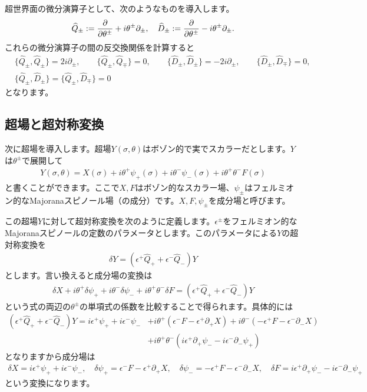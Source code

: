 \documentclass[report,paper=a4, fontsize=12pt, line_length=16cm, number_of_lines=34,dvipdfmx]{jlreq}
\numberwithin{equation}{chapter}
\numberwithin{equation}{section}
\newcommand{\del}{\partial}
\newcommand{\Qd}{\widehat{Q}}
\newcommand{\Dd}{\widehat{D}}
\begin{document}
超世界面の微分演算子として、次のようなものを導入します。
\begin{align}
  \Qd_{\pm}:=\pdv{\theta^{\pm}}+i\theta^{\pm}\del_{\pm},\quad
  \Dd_{\pm}:=\pdv{\theta^{\pm}}-i\theta^{\pm}\del_{\pm}.
\end{align}
これらの微分演算子の間の反交換関係を計算すると
\begin{align}
&  \{\Qd_{\pm},\Qd_{\pm}\}=2i\del_{\pm},\qquad 
  \{\Qd_{\pm},\Qd_{\mp}\}=0,\qquad 
  \{\Dd_{\pm},\Dd_{\pm}\}=-2i\del_{\pm},\qquad 
  \{\Dd_{\pm},\Dd_{\mp}\}=0,\nonumber\\
& \{\Qd_{\pm},\Dd_{\pm}\}=\{\Qd_{\pm},\Dd_{\mp}\}=0
\end{align}
となります。

\subsection{超場と超対称変換}
次に超場を導入します。超場$Y(\sigma,\theta)$はボゾン的で実でスカラーだとします。$Y$は$\theta^{\pm}$で展開して
\begin{align}
  Y(\sigma,\theta)=X(\sigma)+i\theta^{+}\psi_{+}(\sigma)+i\theta^{-}\psi_{-}(\sigma)+i\theta^{+}\theta^{-}F(\sigma)
\end{align}
と書くことができます。ここで$X,F$はボゾン的なスカラー場、$\psi_{\pm}$はフェルミオン的なMajoranaスピノール場（の成分）です。$X,F,\psi_{\pm}$を成分場と呼びます。

この超場$Y$に対して超対称変換を次のように定義します。$\epsilon^{\pm}$をフェルミオン的なMajoranaスピノールの定数のパラメータとします。このパラメータによる$Y$の超対称変換を
\begin{align}
  \delta Y = (\epsilon^{+}\Qd_{+}+\epsilon^{-}\Qd_{-})Y\label{superfieldtransf}
\end{align}
とします。言い換えると成分場の変換は
\begin{align}
  \delta X+i\theta^{+}\delta \psi_{+}+i\theta^{-}\delta \psi_{-}+i\theta^{+}\theta^{-}\delta F = (\epsilon^{+}\Qd_{+}+\epsilon^{-}\Qd_{-})Y
\end{align}
という式の両辺の$\theta^{\pm}$の単項式の係数を比較することで得られます。具体的には
\begin{align}
  (\epsilon^{+}\Qd_{+}+\epsilon^{-}\Qd_{-})Y=i\epsilon^{+}\psi_{+}+i\epsilon^{-}\psi_{-} 
  &+ i\theta^{+}(\epsilon^{-}F-\epsilon^{+}\del_{+}X)
  + i\theta^{-}(-\epsilon^{+}F-\epsilon^{-}\del_{-}X)\nonumber\\
  &+i\theta^{+}\theta^{-}
  (i\epsilon^{+}\del_{+}\psi_{-}-i\epsilon^{-}\del_{-}\psi_{+})
\end{align}
となりますから成分場は
\begin{align}
  \delta X=i\epsilon^{+}\psi_{+}+i\epsilon^{-}\psi_{-} ,\quad
  \delta \psi_{+}=\epsilon^{-}F-\epsilon^{+}\del_{+}X,\quad
  \delta \psi_{-}=-\epsilon^{+}F-\epsilon^{-}\del_{-}X,\quad
  \delta F=i\epsilon^{+}\del_{+}\psi_{-}-i\epsilon^{-}\del_{-}\psi_{+}
\end{align}
という変換になります。
\end{document}
